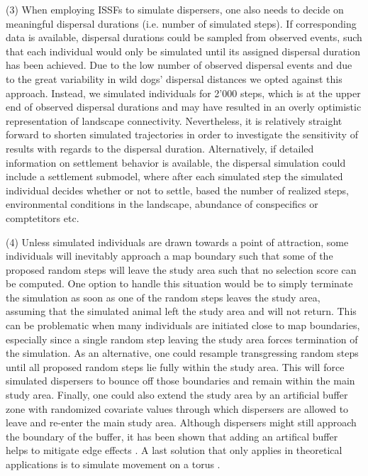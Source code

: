 \documentclass[abstract=on,10pt,a4paper,bibliography=totocnumbered]{article}
\begin{document}
(3) When employing ISSFs to simulate dispersers, one also needs to decide on
meaningful dispersal durations (i.e. number of simulated steps). If
corresponding data is available, dispersal durations could be sampled from
observed events, such that each individual would only be simulated until its
assigned dispersal duration has been achieved. Due to the low number of observed
dispersal events and due to the great variability in wild dogs' dispersal
distances \citep{DaviesMostert.2012, Masenga.2016, Cozzi.2020} we opted against
this approach. Instead, we simulated individuals for 2'000 steps, which is at
the upper end of observed dispersal durations and may have resulted in an overly
optimistic representation of landscape connectivity. Nevertheless, it is
relatively straight forward to shorten simulated trajectories in order to
investigate the sensitivity of results with regards to the dispersal duration.
Alternatively, if detailed information on settlement behavior is available, the
dispersal simulation could include a settlement submodel, where after each
simulated step the simulated individual decides whether or not to settle, based
the number of realized steps, environmental conditions in the landscape,
abundance of conspecifics or comptetitors etc.

(4) Unless simulated individuals are drawn towards a point of attraction, some
individuals will inevitably approach a map boundary such that some of the
proposed random steps will leave the study area such that no selection score can
be computed. One option to handle this situation would be to simply terminate
the simulation as soon as one of the random steps leaves the study area,
assuming that the simulated animal left the study area and will not return. This
can be problematic when many individuals are initiated close to map boundaries,
especially since a single random step leaving the study area forces termination
of the simulation. As an alternative, one could resample transgressing random
steps until all proposed random steps lie fully within the study area. This will
force simulated dispersers to bounce off those boundaries and remain within the
main study area. Finally, one could also extend the study area by an artificial
buffer zone with randomized covariate values through which dispersers are
allowed to leave and re-enter the main study area. Although dispersers might
still approach the boundary of the buffer, it has been shown that adding an
artifical buffer helps to mitigate edge effects \cite{Koen.2010}. A last
solution that only applies in theoretical applications is to simulate movement
on a torus \citep{Hodel.2021b}.
\end{document}

